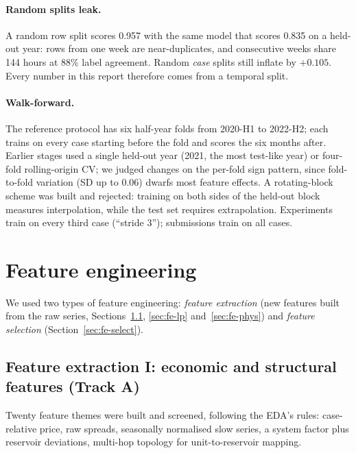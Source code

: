 \documentclass[11pt]{article}
\begin{document}
\paragraph{Random splits leak.} A random row split scores 0.957 with the same model that scores 0.835
on a held-out year: rows from one week are near-duplicates, and consecutive weeks share 144 hours at
88\% label agreement. Random \emph{case} splits still inflate by $+0.105$. Every number in
this report therefore comes from a temporal split.

\paragraph{Walk-forward.} The reference protocol has six half-year folds from 2020-H1
to 2022-H2; each trains on every case starting before the fold and scores the six months after.
Earlier stages used a single held-out year (2021, the most test-like year) or four-fold
rolling-origin CV; we judged changes on the per-fold sign pattern, since fold-to-fold variation (SD
up to 0.06) dwarfs most feature effects. A rotating-block scheme was built and rejected: training on
both sides of the held-out block measures interpolation, while the test set requires extrapolation.
Experiments train on every third case (``stride 3''); submissions train on all cases.

\section{Feature engineering}
\label{sec:r-fe}

We used two types of feature engineering: \emph{feature extraction} (new features
built from the raw series, Sections~\ref{sec:fe-econ}, \ref{sec:fe-lp} and~\ref{sec:fe-phys}) and
\emph{feature selection} (Section~\ref{sec:fe-select}).

\subsection{Feature extraction I: economic and structural features (Track A)}
\label{sec:fe-econ}

Twenty feature themes were built and screened, following the EDA's rules:
case-relative price, raw spreads, seasonally normalised slow series, a system factor plus
reservoir deviations, multi-hop topology for unit-to-reservoir mapping.
\end{document}
